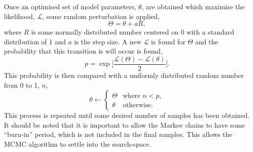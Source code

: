 \documentclass[
 reprint,
 superscriptaddress,
 amsmath,amssymb,
 aps,
]{revtex4-2}
\begin{document}
Once an optimised set of model parameters, $\theta$, are obtained which maximise the likelihood, $\mathcal{L}$, some random perturbation is applied, 
%
\begin{equation}
    \Theta = \theta + aR,
\end{equation}
%
where $R$ is some normally distributed number centered on \num{0} with a standard distribution of \num{1} and $a$ is the step size. 
A new $\mathcal{L}$ is found for $\Theta$ and the probability that this transition is will occur is found, 
%
\begin{equation}
    p = \exp{\bigg[\frac{\mathcal{L}(\Theta) - \mathcal{L}(\theta)}{2}\bigg]}. 
\end{equation}
%
This probability is then compared with a uniformly distributed random number from \num{0} to \num{1}, $n$,
%
\begin{equation}
    \theta \leftarrow
    \begin{cases}
        \Theta & \text{where } n < p,\\
        \theta & \text{otherwise}.
    \end{cases}
\end{equation}
%
This process is repeated until some desired number of samples has been obtained. 
It should be noted that it is important to allow the Markov chains to have some ``burn-in'' period, which is not included in the final samples. 
This allows the MCMC algorithm to settle into the search-space. 
\end{document}
